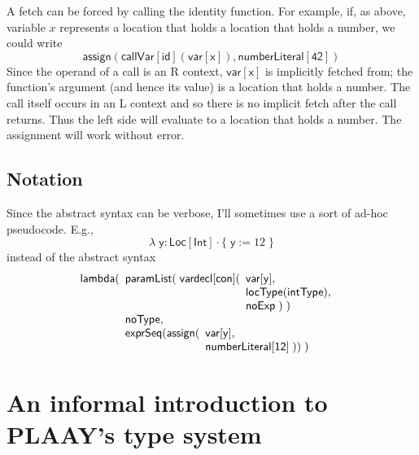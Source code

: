 \documentclass[12pt]{article}
\begin{document}
A fetch can be forced by calling the identity function. For example, if, as
above, variable $x$ represents a location that holds a location that holds a
number, we could write%
\begin{equation*}
\mathsf{assign(callVar[id](var[x]),numberLiteral[42])}
\end{equation*}%
Since the operand of a call is an R context, $\mathsf{var[x]}$ is implicitly
fetched from; the function's argument (and hence its value) is a location
that holds a number. The call itself occurs in an L context and so there is
no implicit fetch after the call returns. Thus the left side will evaluate
to a location that holds a number. The assignment will work without error.

\subsection{Notation}

Since the abstract syntax can be verbose, I'll sometimes use a sort of
ad-hoc pseudocode. E.g.,%
\begin{equation*}
\lambda \;\mathsf{y}:\mathsf{Loc}[\mathsf{Int}]\cdot \{\;\mathsf{y}:=12\;\}
\end{equation*}%
instead of the abstract syntax%
\begin{equation*}
\mathsf{lambda(}%
\begin{array}[t]{l}
\mathsf{paramList(\;vardecl[con](}%
\begin{array}[t]{l}
\mathsf{var[y],} \\ 
\mathsf{locType(intType),} \\ 
\mathsf{noExp\;)\;)}%
\end{array}
\\ 
\mathsf{noType,} \\ 
\mathsf{exprSeq(assign(}%
\begin{array}[t]{l}
\mathsf{var[y],} \\ 
\mathsf{numberLiteral[12]\;))\;)}%
\end{array}%
\end{array}%
\end{equation*}

\section{An informal introduction to PLAAY's type system}
\end{document}

